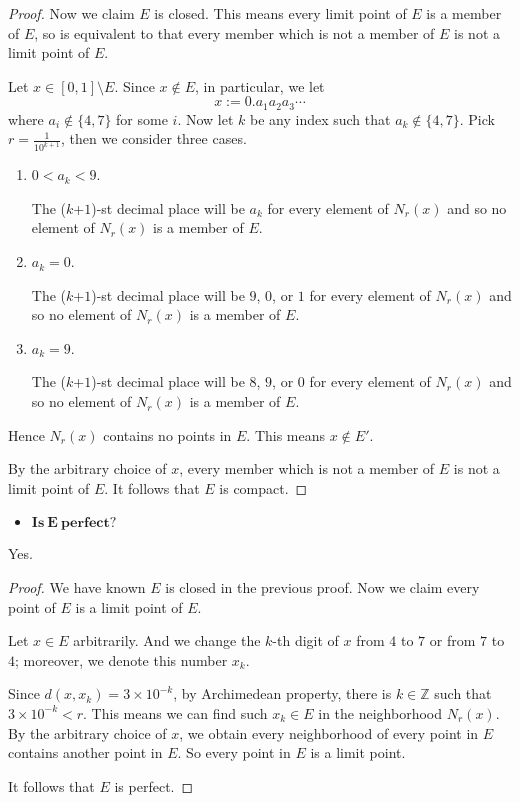 \begin{Exercise}
\begin{proof}
Now we claim $E$ is closed. This means every limit point of $E$ is a member of $E$, so is equivalent to that every member which is not a member of $E$ is not a limit point of $E$.

Let $x\in[0,1]\setminus E$. Since $x\notin E$, in particular, we let
$$
x := 0.a_1 a_2 a_3 \cdots
$$
where $a_i\notin \{4,7\}$ for some $i$. Now let $k$ be any index such that $a_k\notin\{4,7\}$. Pick $r = \frac{1}{10^{k+1}}$, then we consider three cases.

\begin{enumerate}
\item $0 < a_k < 9$.

The ($k$+$1$)-st decimal place will be $a_k$ for every element of $N_r(x)$ and so no element of $N_r(x)$ is a member of $E$.

\item $a_k = 0$.

The ($k$+$1$)-st decimal place will be $9$, $0$, or $1$ for every element of $N_r(x)$ and so no element of $N_r(x)$ is a member of $E$.

\item $a_k = 9$.

The ($k$+$1$)-st decimal place will be $8$, $9$, or $0$ for every element of $N_r(x)$ and so no element of $N_r(x)$ is a member of $E$.
\end{enumerate}
Hence $N_r(x)$ contains no points in $E$. This means $x\notin E'$.

By the arbitrary choice of $x$, every member which is not a member of $E$ is not a limit point of $E$. It follows that $E$ is compact.
\end{proof}

\begin{itemize}
\item $\mathbf{Is\ E\ perfect?}$
\end{itemize}
\begin{answer}
Yes.
\end{answer}
\begin{proof}
We have known $E$ is closed in the previous proof. Now we claim every point of $E$ is a limit point of $E$.

Let $x\in E$ arbitrarily. And we change the $k$-th digit of $x$ from $4$ to $7$ or from $7$ to $4$; moreover, we denote this number $x_k$.

Since $d(x, x_k)=3\times 10^{-k}$, by Archimedean property, there is $k\in\mathbb{Z}$ such that $3\times 10^{-k} < r$. This means we can find such $x_k\in E$ in the neighborhood $N_r(x)$. By the arbitrary choice of $x$, we obtain every neighborhood of every point in $E$ contains another point in $E$. So every point in $E$ is a limit point.

It follows that $E$ is perfect.
\end{proof}
\end{Exercise}
